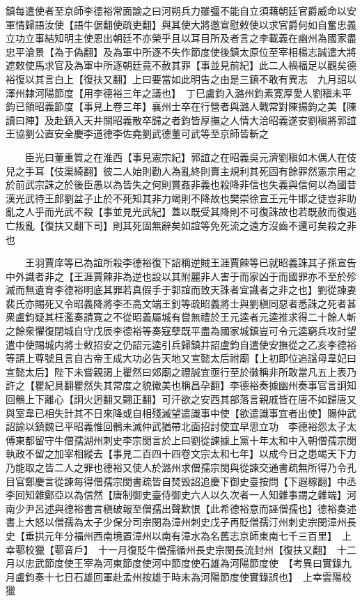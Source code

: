 鎮每遣使者至京師李德裕常面諭之曰河朔兵力雖彊不能自立須藉朝廷官爵威命以安軍情歸語汝使【語牛倨翻使疏吏翻】與其使大將邀宣慰敕使以求官爵何如自奮忠義立功立事結知明主使恩出朝廷不亦榮乎且以耳目所及者言之李載義在幽州為國家盡忠平滄景【為于偽翻】及為軍中所逐不失作節度使後鎮太原位至宰相楊志誠遣大將遮敕使馬求官及為軍中所逐朝廷竟不赦其罪【事並見前紀】此二人禍福足以觀矣德裕復以其言白上【復扶又翻】上曰要當如此明告之由是三鎮不敢有異志　九月詔以澤州隸河陽節度【用李德裕三年之議也】　丁巳盧鈞入潞州鈞素寛厚愛人劉稹未平鈞已領昭義節度【事見上卷三年】襄州士卒在行營者與潞人戰常對陳揚鈞之美【陳讀曰陣】及赴鎮入天井關昭義散卒歸之者鈞皆厚撫之人情大洽昭義遂安劉稹將郭誼王協劉公直安全慶李道德李佐堯劉武德董可武等至京師皆斬之

　　臣光曰董重質之在淮西【事見憲宗紀】郭誼之在昭義吳元濟劉稹如木偶人在伎兒之手耳【伎渠綺翻】彼二人始則勸人為亂終則賣主規利其死固有餘罪然憲宗用之於前武宗誅之於後臣愚以為皆失之何則賞姦非義也殺降非信也失義與信何以為國昔漢光武待王郎劉盆子止於不死知其非力竭則不降故也樊崇徐宣王元牛邯之徒豈非助亂之人乎而光武不殺【事並見光武紀】蓋以既受其降則不可復誅故也若既赦而復逃亡叛亂【復扶又翻下司】則其死固無辭矣如誼等免死流之遠方沒齒不還可矣殺之非也

　　王羽賈庠等已為誼所殺李德裕復下詔稱逆賊王涯賈餗等已就昭義誅其子孫宣告中外識者非之【王涯賈餗非為逆也設以其附麗非人害于而家凶于而國罪亦不至於殄滅而無遺育李德裕明底其罪若真假手于郭誼而致天誅者宜識者之非之也】劉從諫妻裴氏亦賜死又令昭義降將李丕高文端王釗等疏昭義將士與劉稹同惡者悉誅之死者甚衆盧鈞疑其枉濫奏請寛之不從昭義屬城有嘗無禮於王元逵者元逵推求得二十餘人斬之餘衆懼復閉城自守戊辰李德裕等奏寇孽既平盡為國家城鎮豈可令元逵窮兵攻討望遣中使賜城内將士敕招安之仍詔元逵引兵歸鎮并詔盧鈞自遣使安撫從之乙亥李德裕等請上尊號且言自古帝王成大功必告天地又宣懿太后祔廟【上初即位追諡母韋妃曰宣懿太后】陛下未嘗親謁上瞿然曰郊廟之禮誠宜亟行至於徽稱非所敢當凡五上表乃許之【瞿紀具翻瞿然失其常度之貌徽美也稱昌孕翻】李德裕奏據幽州奏事官言詗知回鶻上下離心【詗火迥翻又翾正翻】可汗欲之安西其部落言親戚皆在唐不如歸唐又與室韋已相失計其不日來降或自相殘滅望遣識事中使【欲遣識事宜者出使】賜仲武詔諭以鎮魏已平昭義惟回鶻未滅仲武猶帶北面招討使宜早思立功　李德裕怨太子太傅東都留守牛僧孺湖州刺史李宗閔言於上曰劉從諫據上黨十年太和中入朝僧孺宗閔執政不留之加宰相縱去【事見二百四十四卷文宗太和七年】以成今日之患竭天下力乃能取之皆二人之罪也德裕又使人於潞州求僧孺宗閔與從諫交通書疏無所得乃令孔目官鄭慶言從諫每得僧孺宗閔書疏皆自焚毁詔追慶下御史臺按問【下遐稼翻】中丞李回知雜鄭亞以為信然【唐制御史臺侍御史六人以久次者一人知雜事謂之雜端】河南少尹呂述與德裕書言稹破報至僧孺出聲歎恨【此希德裕意而誣僧孺也】德裕奏述書上大怒以僧孺為太子少保分司宗閔為漳州刺史戊子再貶僧孺汀州刺史宗閔漳州長史【垂拱元年分福州西南境置漳州以南有漳水為名舊志京師東南七千三百里】　上幸鄠校獵【鄠音戶】　十一月復貶牛僧孺循州長史宗閔長流封州【復扶又翻】　十二月以忠武節度使王宰為河東節度使河中節度使石雄為河陽節度使　【考異曰實錄九月盧鈞奏十七日石雄回軍赴孟州按雄于時未為河陽節度使實錄誤也】　上幸雲陽校獵


